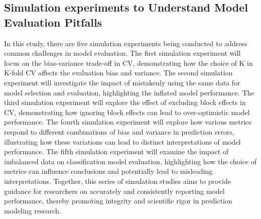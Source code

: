 \subsection{Simulation experiments to Understand Model Evaluation Pitfalls}

In this study, there are five simulation experiments being conducted to address common challenges in model evaluation. The first simulation experiment will focus on the bias-variance trade-off in CV, demonstrating how the choice of K in K-fold CV affects the evaluation bias and variance. The second simulation experiment will investigate the impact of mistakenly using the same data for model selection and evaluation, highlighting the inflated model performance. The third simulation experiment will explore the effect of excluding block effects in CV, demonstrating how ignoring block effects can lead to over-optimistic model performance. The fourth simulation experiment will explore how various metrics respond to different combinations of bias and variance in prediction errors, illustrating how these variations can lead to distinct interpretations of model performance. The fifth simulation experiment will examine the impact of imbalanced data on classification model evaluation, highlighting how the choice of metrics can influence conclusions and potentially lead to misleading interpretations. Together, this series of simulation studies aims to provide guidance for researchers on accurately and consistently reporting model performance, thereby promoting integrity and scientific rigor in prediction modeling research.